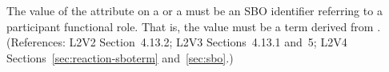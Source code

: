 The value of the  attribute on a \SpeciesReference or a
\ModifierSpeciesReference must be an SBO identifier referring to a
participant functional role.  That is, the value must be a term derived
from \sboparticipantfunctional.     (References: 
L2V2 Section~4.13.2; L2V3 Sections~4.13.1 and~5; L2V4 Sections~\ref{sec:reaction-sboterm} and~\ref{sec:sbo}.)
